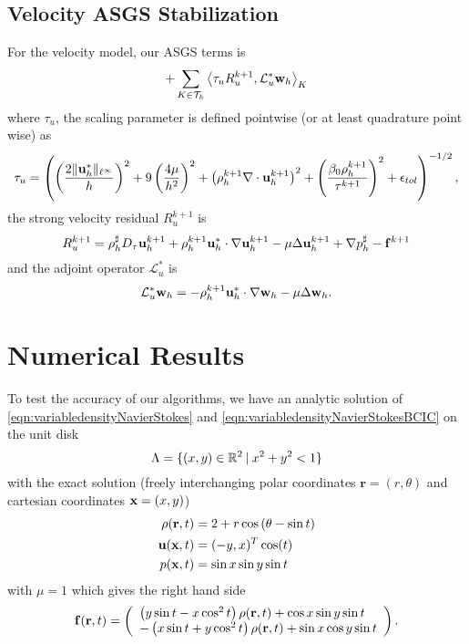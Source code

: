 \documentclass[letterpaper]{erdc}
\begin{document}
\subsection{Velocity ASGS Stabilization} For the velocity model, our ASGS terms is
\begin{equation}
  +\displaystyle\sum_{K\in\mathcal{T}_h}\left\langle \tau_u R_u^{k+1}, \mathcal{L}_u^{*} \textbf{w}_h \right\rangle_{K}
\end{equation}
where $\tau_u$, the scaling parameter is defined pointwise (or at least quadrature point wise) as
\begin{align}
\tau_u = \left(\left(\frac{2\|\textbf{u}^{*}_h\|_{\ell^{\infty}}}{h}\right)^2 + 9\left( \frac{4\mu}{h^2}\right)^2 + \left(\rho^{k+1}_h\nabla\cdot \textbf{u}^{k+1}_h\right)^2 + \left( \frac{\beta_0\rho^{k+1}_h}{\tau^{k+1}} \right)^2 + \epsilon_{tol}\right)^{-1/2},
\end{align}
the strong velocity residual $R_u^{k+1}$ is
\begin{equation}
  R_u^{k+1} = \rho_h^{\sharp}D_\tau \textbf{u}^{k+1}_h + \rho_h^{k+1}\textbf{u}_h^{*}\cdot\nabla\textbf{u}_h^{k+1} - \mu\Delta\textbf{u}_h^{k+1} + \nabla p_h^{\sharp} - \mathbf{f}^{k+1}
\end{equation}
and the adjoint operator $\mathcal{L}_{u}^{*}$ is
\begin{equation}
  \mathcal{L}_u^{*} \textbf{w}_h = -\rho_h^{k+1}\textbf{u}_h^{*}\cdot\nabla\textbf{w}_h - \mu\Delta \textbf{w}_h.
\end{equation}




%
%
%
\section{Numerical Results}\label{sec:NumericalResults}

To test the accuracy of our algorithms, we have an analytic solution of \ref{eqn:variabledensityNavierStokes} and \ref{eqn:variabledensityNavierStokesBCIC} on the unit disk
\begin{equation}
  \Lambda = \{ (x,y) \in \mathbb{R}^{2} \:|\: x^2 + y^2 < 1 \}
\end{equation}
with the exact solution (freely interchanging polar coordinates $\mathbf{r} = (r,\theta)$ and cartesian coordinates $\textbf{x} = (x,y)$)
\begin{align}
  \rho(\mathbf{r},t) & = 2 + r\cos\left(\theta - \sin t  \right)\\
  \textbf{u}(\textbf{x},t) &= (-y, x)^T \cos(t)\\
  p(\textbf{x},t) &= \sin x \sin y \sin t
\end{align}
with $\mu = 1$ which gives the right hand side
\begin{equation}
  \mathbf{f}(\mathbf{r},t) = \left(\begin{array}{l} \left( y\sin t - x\cos^2 t\right)\rho(\mathbf{r},t) + \cos x \sin y \sin t\\ -\left(x \sin t + y\cos^2 t\right)\rho(\mathbf{r},t) + \sin x \cos y \sin t \end{array}\right).
\end{equation}
\end{document}

